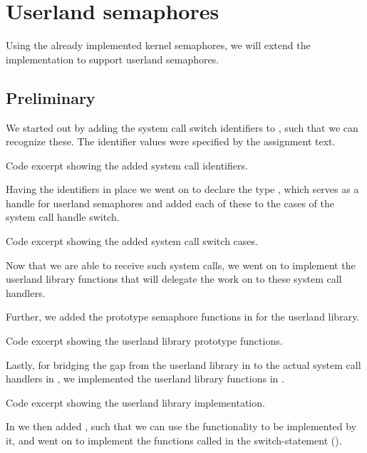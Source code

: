 %
%
%

\section{Userland semaphores}
Using the already implemented kernel semaphores, we will extend the
implementation to support userland semaphores.

\subsection{Preliminary}
We started out by adding the system call switch identifiers to
, such that we can recognize these. The identifier values
were specified by the assignment text.

{Code excerpt showing the added system call identifiers.}

Having the identifiers in place we went on to declare the 
type , which serves as a handle for userland
semaphores and added each of these to the cases of the system call handle
switch.

{Code excerpt showing the added system call switch cases.}

Now that we are able to receive such system calls, we went on to implement the
userland library functions that will delegate the work on to these system
call handlers. 

Further, we added the prototype semaphore functions in  for
the userland library.

{Code excerpt showing the userland library prototype functions.}

Lastly, for bridging the gap from the userland library in 
to the actual system call handlers in , we implemented
the userland library functions in .

{Code excerpt showing the userland library implementation.}

In  we then added ,
such that we can use the functionality to be implemented by it, and went on to
implement the functions called in the switch-statement
().


